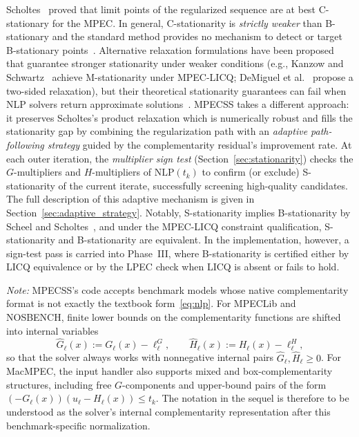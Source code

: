 Scholtes~\cite{Scholtes2001} proved that limit points of the regularized sequence are at best C-stationary for the MPEC. In general, C-stationarity is \emph{strictly weaker} than B-stationary
 and the standard method provides no mechanism to detect or target B-stationary points~\cite{Scholtes2001,HoheiselKanzowSchwartz2013}. Alternative relaxation formulations have been proposed that guarantee stronger stationarity under weaker
 conditions (e.g., Kanzow and Schwartz~\cite{KanzowSchwartz2013} achieve
 M-stationarity under MPEC-LICQ; DeMiguel et al.~\cite{DeMiguel2005} propose a two-sided relaxation), but their theoretical stationarity guarantees can
 fail when NLP solvers return approximate solutions~\cite{KanzowSchwartz2015}. MPECSS
 takes a different approach: it preserves Scholtes's product relaxation which is
 numerically robust and fills the stationarity gap by combining the regularization path
 with an \emph{adaptive path-following strategy} guided by
the complementarity residual's improvement rate. At each
outer iteration, the \emph{multiplier sign test} (Section~\ref{sec:stationarity})
checks the $G$-multipliers and $H$-multipliers of
$\text{NLP}(t_k)$ to confirm (or exclude) S-stationarity of the
current iterate, successfully screening high-quality candidates. The full description of this adaptive mechanism is given
in Section~\ref{sec:adaptive_strategy}. Notably, S-stationarity implies B-stationarity by
Scheel and Scholtes~\citep{ScheelScholtes2000}, and under the
MPEC-LICQ constraint qualification, S-stationarity and B-stationarity
are equivalent. In the implementation, however, a sign-test pass is
carried into Phase~III, where B-stationarity is certified either by
LICQ equivalence or by the LPEC check when LICQ is absent or
fails to hold.

\textit{Note:} MPECSS's code accepts benchmark models whose native complementarity format is
not exactly the textbook form~\eqref{eq:nlp}. For MPECLib and
NOSBENCH, finite lower bounds on the complementarity functions are
shifted into internal variables
\[
  \widehat G_\ell(x) := G_\ell(x)-\ell^G_\ell,\qquad
  \widehat H_\ell(x) := H_\ell(x)-\ell^H_\ell,
\]
so that the solver always works with nonnegative internal pairs
$\widehat G_\ell,\widehat H_\ell \ge 0$. For MacMPEC, the input handler also
supports mixed and box-complementarity structures, including free
$G$-components and upper-bound pairs of the form
$(-G_\ell(x))(u_\ell-H_\ell(x)) \le t_k$. The notation in the sequel is
therefore to be understood as the solver's internal complementarity
representation after this benchmark-specific normalization.


